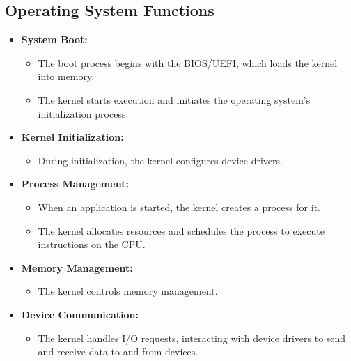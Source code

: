 \subsection{Operating System Functions}
\begin{itemize}
    \item \textbf{System Boot:}
    \begin{itemize}
        \item The boot process begins with the BIOS/UEFI, which loads the kernel into memory.
        \item The kernel starts execution and initiates the operating system's initialization process.
    \end{itemize}
    \item \textbf{Kernel Initialization:}
    \begin{itemize}
        \item During initialization, the kernel configures device drivers.
    \end{itemize}
    \item \textbf{Process Management:}
    \begin{itemize}
        \item When an application is started, the kernel creates a process for it.
        \item The kernel allocates resources and schedules the process to execute instructions on the CPU.
    \end{itemize}
    \item \textbf{Memory Management:}
    \begin{itemize}
        \item The kernel controls memory management.
    \end{itemize}
    \item \textbf{Device Communication:}
    \begin{itemize}
        \item The kernel handles I/O requests, interacting with device drivers to send and receive data to and from devices.
    \end{itemize}
\end{itemize}

